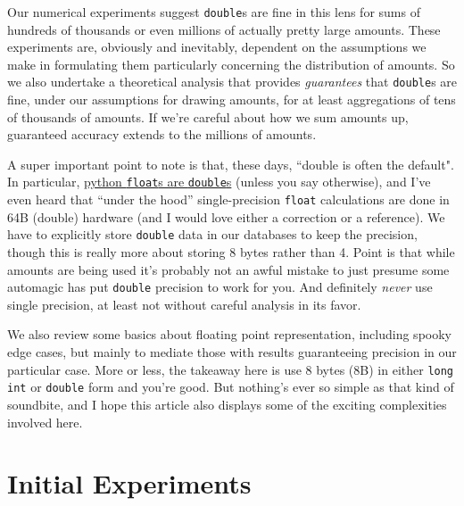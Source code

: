 \documentclass[11pt, oneside]{amsart}   	%
\begin{document}
Our numerical experiments suggest \texttt{double}s are fine in this lens for sums of hundreds of thousands or even millions of actually pretty large amounts. These experiments are, obviously and inevitably, dependent on the assumptions we make in formulating them particularly concerning the distribution of amounts. So we also undertake a theoretical analysis that provides {\em guarantees} that \texttt{double}s are fine, under our assumptions for drawing amounts, for at least aggregations of tens of thousands of amounts. If we're careful about how we sum amounts up, guaranteed accuracy extends to the millions of amounts. 

A super important point to note is that, these days, ``double is often the default". In particular, \href{https://docs.python.org/3/tutorial/floatingpoint.html}{python \texttt{float}s are \texttt{double}s} (unless you say otherwise), and I've even heard that ``under the hood'' single-precision \texttt{float} calculations are done in 64B (double) hardware (and I would love either a correction or a reference). We have to explicitly store \texttt{double} data in our databases to keep the precision, though this is really more about storing 8 bytes rather than 4. Point is that while amounts are being used it's probably not an awful mistake to just presume some automagic has put \texttt{double} precision to work for you. And definitely {\em never} use single precision, at least not without careful analysis in its favor. 

We also review some basics about floating point representation, including spooky edge cases, but mainly to mediate those with results guaranteeing precision in our particular case. More or less, the takeaway here is use 8 bytes (8B) in either \texttt{long int} or \texttt{double} form and you're good. But nothing's ever so simple as that kind of soundbite, and I hope this article also displays some of the exciting complexities involved here. 

\section{Initial Experiments}
\end{document}
